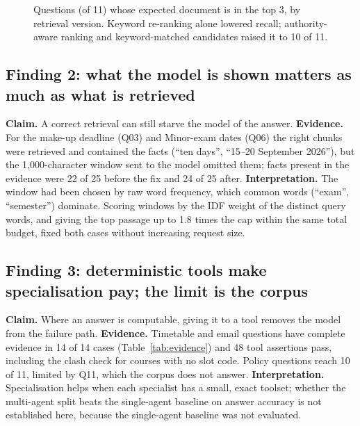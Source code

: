 \documentclass[10pt,a4paper]{article}
\begin{document}
\begin{figure}[H]
\centering
{}
\caption{Questions (of 11) whose expected document is in the top 3, by retrieval version. Keyword re-ranking alone lowered recall; authority-aware ranking and keyword-matched candidates raised it to 10 of 11.}\label{fig:retrabl}
\end{figure}

\subsection*{Finding 2: what the model is shown matters as much as what is retrieved}
\textbf{Claim.} A correct retrieval can still starve the model of the answer. \textbf{Evidence.} For the make-up deadline (Q03) and Minor-exam dates (Q06) the right chunks were retrieved and contained the facts (``ten days'', ``15--20 September 2026''), but the 1,000-character window sent to the model omitted them; facts present in the evidence were 22 of 25 before the fix and 24 of 25 after. \textbf{Interpretation.} The window had been chosen by raw word frequency, which common words (``exam'', ``semester'') dominate. Scoring windows by the IDF weight of the distinct query words, and giving the top passage up to 1.8 times the cap within the same total budget, fixed both cases without increasing request size.

\subsection*{Finding 3: deterministic tools make specialisation pay; the limit is the corpus}
\textbf{Claim.} Where an answer is computable, giving it to a tool removes the model from the failure path. \textbf{Evidence.} Timetable and email questions have complete evidence in 14 of 14 cases (Table~\ref{tab:evidence}) and 48 tool assertions pass, including the clash check for courses with no slot code. Policy questions reach 10 of 11, limited by Q11, which the corpus does not answer. \textbf{Interpretation.} Specialisation helps when each specialist has a small, exact toolset; whether the multi-agent split beats the single-agent baseline on answer accuracy is not established here, because the single-agent baseline was not evaluated.
\end{document}
